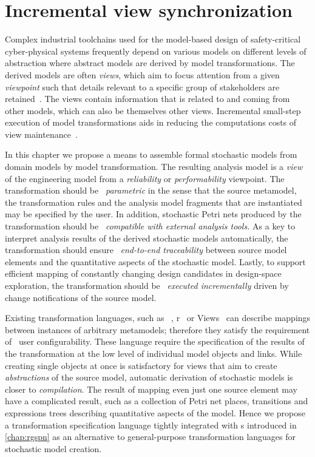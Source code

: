 \chapter{Incremental view synchronization}
\label{chap:transform}

Complex industrial toolchains used for the model-based design of safety-critical cyber-physical systems frequently depend on various models on different levels of abstraction where abstract models are derived by model transformations. The derived models are often \emph{views}, which aim to focus attention from a given \emph{viewpoint} such that details relevant to a specific group of stakeholders are retained~\citep{Bruneliere17survey}. The views contain information that is related to and coming from other models, which can also be themselves other views. Incremental small-step execution of model transformations aids in reducing the computations costs of view maintenance~\citep{Varro15styles}.

In this chapter we propose a means to assemble formal stochastic models from domain models by model transformation. The resulting analysis model is a \emph{view} of the engineering model from a \emph{reliability} or \emph{performability} viewpoint. The transformation should be ~\emph{parametric} in the sense that the source metamodel, the transformation rules and the analysis model fragments that are instantiated may be specified by the user. In addition, stochastic Petri nets produced by the transformation should be ~\emph{compatible with external analysis tools.} As a key to interpret analysis results of the derived stochastic models automatically, the transformation should ensure ~\emph{end-to-end traceability} between source model elements and the quantitative aspects of the stochastic model. Lastly, to support efficient mapping of constantly changing design candidates in design-space exploration, the transformation should be ~\emph{executed incrementally} driven by change notifications of the source model.

Existing transformation languages, such as ~\citep{Jouault08atl}, r~\citep[Chapter~7]{OMG16qvt} or  Views~\citep{Debreceni14viewmodel} can describe mappings between instances of arbitrary metamodels; therefore they satisfy the requirement of ~user configurability. These language require the specification of the results of the transformation at the low level of individual model objects and links. While creating single objects at once is satisfactory for views that aim to create \emph{abstractions} of the source model, automatic derivation of stochastic models is closer to \emph{compilation}. The result of mapping even just one source element may have a complicated result, such as a collection of Petri net places, transitions and expressions trees describing quantitative aspects of the model. Hence we propose a transformation specification language tightly integrated with s introduced in \cref{chap:rgspn} as an alternative to general-purpose transformation languages for stochastic model creation.

